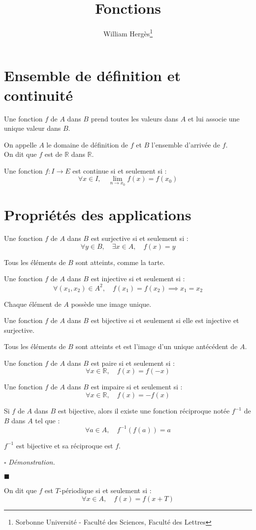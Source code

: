\documentclass[a4paper, titlepage]{article}
\title{Fonctions}
\author{William Hergès\thanks{Sorbonne Université - Faculté des Sciences, Faculté des Lettres}}
\renewenvironment{proof}{$\square$ \footnotesize\textit{Démonstration.}}{\begin{flushright}$\blacksquare$\end{flushright}}
\begin{document}
	\maketitle
	\tableofcontents
	\newpage
	\section{Ensemble de définition et continuité}
	\begin{defn}
		Une fonction $f$ de $A$ dans $B$ prend toutes les valeurs dans $A$ et lui associe une unique valeur dans $B$.

		On appelle $A$ le domaine de définition de $f$ et $B$ l'ensemble d'arrivée de $f$.\\
		On dit que $f$ est de $\mathbb{R}$ dans $\mathbb{R}$.
	\end{defn}
	\begin{defn}
		Une fonction $f:I\to E$ est continue si et seulement si :
		$$ \forall x\in I,\quad \lim_{n \to x_0} f(x) = f(x_0) $$
	\end{defn}
	\section{Propriétés des applications}
	\begin{defn}
		Une fonction $f$ de $A$ dans $B$ est surjective si et seulement si :
		$$ \forall y\in B,\quad\exists x\in A,\quad f(x)=y $$
	\end{defn}
	Tous les éléments de $B$ sont atteints, comme la tarte.
	\begin{defn}
		Une fonction $f$ de $A$ dans $B$ est injective si et seulement si :
		$$ \forall (x_1,x_2)\in A^2,\quad f(x_1)=f(x_2) \implies x_1=x_2 $$
	\end{defn}
	Chaque élément de $A$ possède une image unique.
	\begin{defn}
		Une fonction $f$ de $A$ dans $B$ est bijective si et seulement si elle est injective et surjective.
	\end{defn}
	Tous les éléments de $B$  sont atteints et est l'image d'un unique antécédent de $A$.
	\begin{defn}
		Une fonction $f$ de $A$ dans $B$ est paire si et seulement si :
		$$ \forall x\in\mathbb{R},\quad f(x)=f(-x) $$
	\end{defn}
	\begin{defn}
		Une fonction $f$ de $A$ dans $B$ est impaire si et seulement si :
		$$ \forall x\in\mathbb{R},\quad f(x)=-f(x) $$
	\end{defn}
	\begin{defn}
		Si $f$ de $A$ dans $B$ est bijective, alors il existe une fonction réciproque notée $f^{-1}$ de $B$ dans $A$ tel que :
		$$ \forall a\in A,\quad f^{-1}(f(a)) = a $$
	\end{defn}
	\begin{props}
		$f^{-1}$ est bijective et sa réciproque est $f$.
	\end{props}
	\begin{proof}
		\AQT
	\end{proof}
	\begin{defn}
		On dit que $f$ est $T$-périodique si et seulement si :
		$$ \forall x\in A,\quad f(x)=f(x+T) $$
	\end{defn}
\end{document}
